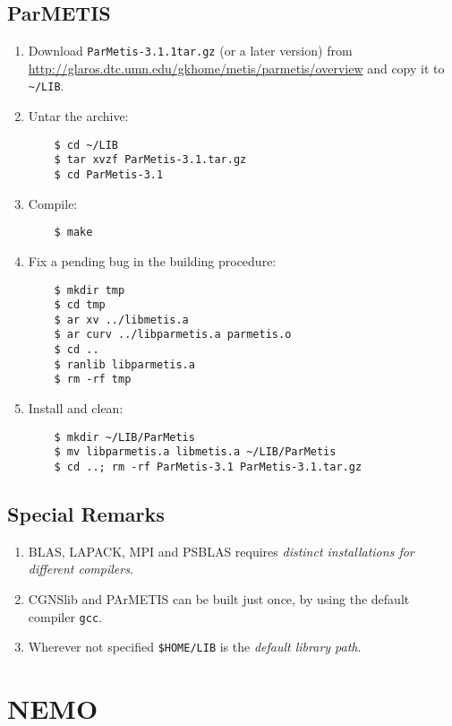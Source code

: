 \documentclass[a4paper,12pt]{article}%
\begin{document}
\subsection{ParMETIS}

\begin{enumerate}
\item Download \verb+ParMetis-3.1.1tar.gz+ (or a later version) from
  \url{http://glaros.dtc.umn.edu/gkhome/metis/parmetis/overview} and
  copy it to \verb+~/LIB+.
\item Untar the archive:
  \begin{Verbatim}
    $ cd ~/LIB
    $ tar xvzf ParMetis-3.1.tar.gz
    $ cd ParMetis-3.1
  \end{Verbatim}
\item Compile:
  \begin{Verbatim}
    $ make
  \end{Verbatim}
\item Fix a pending bug in the building procedure:
  \begin{Verbatim}
    $ mkdir tmp
    $ cd tmp
    $ ar xv ../libmetis.a
    $ ar curv ../libparmetis.a parmetis.o
    $ cd ..
    $ ranlib libparmetis.a
    $ rm -rf tmp
  \end{Verbatim}
\item Install and clean:
  \begin{Verbatim}
    $ mkdir ~/LIB/ParMetis
    $ mv libparmetis.a libmetis.a ~/LIB/ParMetis
    $ cd ..; rm -rf ParMetis-3.1 ParMetis-3.1.tar.gz
  \end{Verbatim}
\end{enumerate}

\subsection{Special Remarks}

\begin{enumerate}
\item BLAS, LAPACK, MPI and PSBLAS requires
\emph{distinct installations for different compilers}.
\item CGNSlib and PArMETIS can be built just once, by using the
  default compiler \verb+gcc+.
\item Wherever not specified \verb+$HOME/LIB+ is the \emph{default
    library path}.
\end{enumerate}

\section{NEMO}
\end{document}
